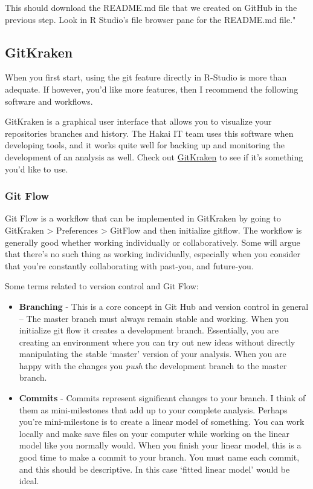 \documentclass[]{book}
\begin{document}
This should download the README.md file that we created on GitHub in the
previous step. Look in R Studio's file browser pane for the README.md
file."

\subsection{GitKraken}\label{gitkraken}

When you first start, using the git feature directly in R-Studio is more
than adequate. If however, you'd like more features, then I recommend
the following software and workflows.

GitKraken is a graphical user interface that allows you to visualize
your repositories branches and history. The Hakai IT team uses this
software when developing tools, and it works quite well for backing up
and monitoring the development of an analysis as well. Check out
\href{https://www.gitkraken.com/}{GitKraken} to see if it's something
you'd like to use.

\subsubsection{Git Flow}\label{git-flow}

Git Flow is a workflow that can be implemented in GitKraken by going to
GitKraken \textgreater{} Preferences \textgreater{} GitFlow and then
initialize gitflow. The workflow is generally good whether working
individually or collaboratively. Some will argue that there's no such
thing as working individually, especially when you consider that you're
constantly collaborating with past-you, and future-you.

Some terms related to version control and Git Flow:

\begin{itemize}
\item
  \textbf{Branching} - This is a core concept in Git Hub and version
  control in general -- The master branch must always remain stable and
  working. When you initialize git flow it creates a development branch.
  Essentially, you are creating an environment where you can try out new
  ideas without directly manipulating the stable `master' version of
  your analysis. When you are happy with the changes you \emph{push} the
  development branch to the master branch.
\item
  \textbf{Commits} - Commits represent significant changes to your
  branch. I think of them as mini-milestones that add up to your
  complete analysis. Perhaps you're mini-milestone is to create a linear
  model of something. You can work locally and make save files on your
  computer while working on the linear model like you normally would.
  When you finish your linear model, this is a good time to make a
  commit to your branch. You must name each commit, and this should be
  descriptive. In this case `fitted linear model' would be ideal.
\end{itemize}
\end{document}
